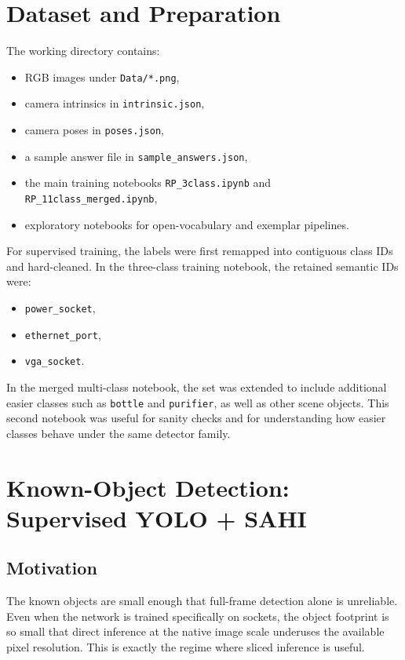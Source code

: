 \documentclass[11pt,a4paper]{article}
\begin{document}
\section{Dataset and Preparation}

The working directory contains:
\begin{itemize}[leftmargin=1.5em]
  \item RGB images under \texttt{Data/*.png},
  \item camera intrinsics in \texttt{intrinsic.json},
  \item camera poses in \texttt{poses.json},
  \item a sample answer file in \texttt{sample\_answers.json},
  \item the main training notebooks \texttt{RP\_3class.ipynb} and \texttt{RP\_11class\_merged.ipynb},
  \item exploratory notebooks for open-vocabulary and exemplar pipelines.
\end{itemize}

For supervised training, the labels were first remapped into contiguous class IDs and hard-cleaned. In the three-class training notebook, the retained semantic IDs were:
\begin{itemize}[leftmargin=1.5em]
  \item \texttt{power\_socket},
  \item \texttt{ethernet\_port},
  \item \texttt{vga\_socket}.
\end{itemize}

In the merged multi-class notebook, the set was extended to include additional easier classes such as \texttt{bottle} and \texttt{purifier}, as well as other scene objects. This second notebook was useful for sanity checks and for understanding how easier classes behave under the same detector family.

\section{Known-Object Detection: Supervised YOLO + SAHI}

\subsection{Motivation}

The known objects are small enough that full-frame detection alone is unreliable. Even when the network is trained specifically on sockets, the object footprint is so small that direct inference at the native image scale underuses the available pixel resolution. This is exactly the regime where sliced inference is useful.
\end{document}
